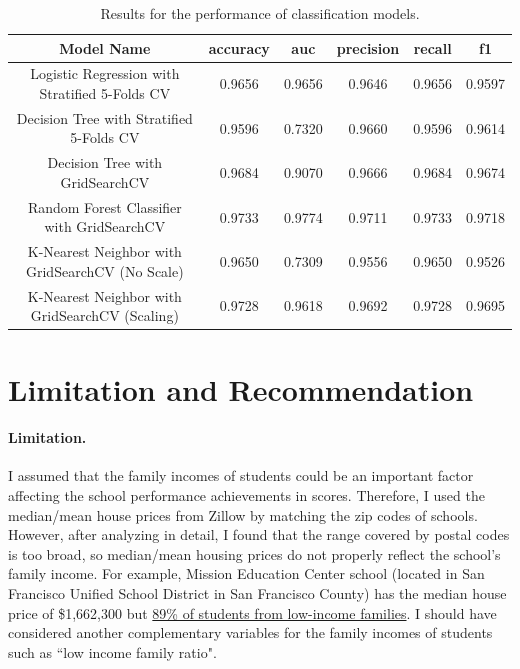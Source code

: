\documentclass[11pt]{article}
\begin{document}
\begin{table}[h!]
\centering
\begin{tabular}{||c|c|c|c|c|c||}
  \hline
Model Name & accuracy & auc & precision & recall & f1\\
  \hline
Logistic Regression with Stratified 5-Folds CV &
0.9656	& 0.9656 &	0.9646 &	0.9656  &	0.9597 \\
\hline
Decision Tree with Stratified 5-Folds CV & 
0.9596	&0.7320	&0.9660	&0.9596	&0.9614\\
\hline
Decision Tree with GridSearchCV & 
0.9684	&0.9070	&0.9666	&0.9684	&0.9674\\
\hline
\cellcolor{red!25}Random Forest Classifier with GridSearchCV& \cellcolor{red!25}0.9733& \cellcolor{red!25}0.9774&  \cellcolor{red!25}0.9711& \cellcolor{red!25}	0.9733	& \cellcolor{red!25}0.9718\\
\hline
K-Nearest Neighbor with GridSearchCV (No Scale) & 
0.9650&	0.7309&	0.9556&	0.9650&	0.9526\\
\hline
\cellcolor{green!25}K-Nearest Neighbor with GridSearchCV (Scaling) & 
\cellcolor{green!25}0.9728&	\cellcolor{green!25}0.9618&	\cellcolor{green!25}0.9692&	\cellcolor{green!25}0.9728&	\cellcolor{green!25}0.9695\\
  \hline
\end{tabular}
\caption{Results for the performance of classification models.}
\label{table:acc_classification}
\end{table}



\section{Limitation and Recommendation}
\label{Limitation and Recommendation}

\paragraph*{Limitation.}

I assumed that the family incomes of students could be an important factor affecting the school performance achievements in scores. Therefore, I used the median/mean house prices from Zillow \cite{Zillow_research_data} by matching the zip codes of schools.
%
However, after analyzing in detail, I found that the range covered by postal codes is too broad, so median/mean housing prices do not properly reflect the school's family income.
For example, Mission Education Center school (located in San Francisco Unified School District in San Francisco County) has the median house price of \$1,662,300 but \href{https://www.greatschools.org/california/san-francisco/6410-Mission-Education-Center/#Low-income_students}{89\% of students from low-income families}.
%
%
%
I should have considered another complementary variables for the family incomes of students such as ``low income family ratio".
\end{document}
